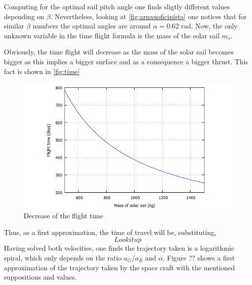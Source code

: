 \documentclass[twocolumn,12pt,a4paper]{article}
\numberwithin{equation}{section}
\begin{document}
Computing for the optimal sail pitch angle one finds sligtly different values depending on $\beta$. Nevertheless, looking at \autoref{fig:arnauoficinista} one notices that for similar $\beta$ numbers the optimal angles are around $\alpha=0.62$ rad. Now, the only unknown variable in the time flight formula is the mass of the solar sail $m_s$.

Obviously, the time flight will decrease as the mass of the solar sail becomes bigger as this implies a bigger surface and as a consequence a bigger thrust. This fact is shown in \autoref{fig:time}
\begin{figure}[h]
	\label{fig:time}
	\centering
	\includegraphics[scale=0.3]{time}
	\caption{\small Decrease of the flight time  }
\end{figure}

Thus, as a first approximation, the time of travel will be, substituting,
\[
Look it up
\]
Having solved both velocities, one finds the trajectory taken is a logarithmic spiral, which only depends on the ratio \(a_G/a_R\) and $\alpha$.
Figure ?? shows a first approximation of the trajectory taken by the space craft with the mentioned suppositions and values.
\end{document}
